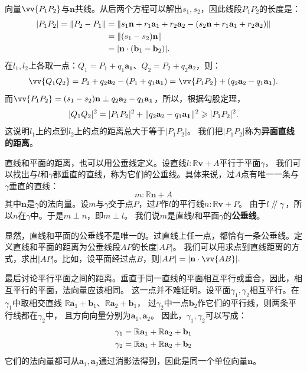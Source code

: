 \documentclass[12pt,UTF8]{ctexbook}
\renewcommand\parallel{\mathrel{/\mskip-4mu/}}
\begin{document}
向量$\vv{P_1P_2}$与$\mathbf{n}$共线。从后两个方程可以解出$s_1,s_2$，因此线段$P_1P_2$的长度是：
\begin{align}
    |P_1P_2| = \|P_2 - P_1\| &= \|s_1\mathbf{n} + r_1\mathbf{a}_1 + r_2\mathbf{a}_2 - (s_2\mathbf{n} + r_1\mathbf{a}_1 + r_2\mathbf{a}_2)\| \notag \\
    &= \| (s_1 - s_2)\mathbf{n} \| \notag \\
    &= |\mathbf{n}\cdot(\mathbf{b}_1 - \mathbf{b}_2)|. \notag
\end{align}
在$l_1,l_2$上各取一点：$Q_1 = P_1 + q_1\mathbf{a_1}$、$Q_2 = P_2 + q_2\mathbf{a}_2$，则：
\begin{align}
    \vv{Q_1Q_2} = P_2 + q_2\mathbf{a}_2 - (P_1 + q_1\mathbf{a_1}) = \vv{P_1P_2}  + (q_2\mathbf{a}_2 - q_1\mathbf{a_1}). \notag 
\end{align}
而$\vv{P_1P_2} = (s_1 - s_2)\mathbf{n} \perp q_2\mathbf{a}_2 - q_1\mathbf{a_1}$，所以，根据勾股定理，
\begin{align}
    |Q_1Q_2|^2 = |P_1P_2|^2 + \|q_2\mathbf{a}_2 - q_1\mathbf{a_1}\|^2 \geqslant |P_1P_2|^2. \notag 
\end{align}
这说明$l_1$上的点到$l_2$上的点的距离总大于等于$|P_1P_2|$。
我们把$|P_1P_2|$称为\textbf{异面直线的距离}。

直线和平面的距离，也可以用公垂线定义。设直线$l:\mathbb{R}\mathbf{v} + A$平行于平面$\gamma$，
我们可以找出与$l$和$\gamma$都垂直的直线，称为它们的公垂线。具体来说，过$A$点有唯一一条与$\gamma$垂直的直线：
$$ m:\mathbb{R}\mathbf{n} + A $$
其中$\mathbf{n}$是$\gamma$的法向量。设$m$与$\gamma$交于点$P$，过$P$作$l$的平行线$n:\mathbb{R}\mathbf{v} + P$。
由于$l\parallel\gamma$，所以$n$在$\gamma$中。于是$m\perp n$，即$m\perp l$。
我们说$m$是直线$l$和平面$\gamma$的\textbf{公垂线}。

显然，直线和平面的公垂线不是唯一的。过直线上任一点，都恰有一条公垂线。定义直线和平面的距离为公垂线段$AP$的长度$|AP|$。
我们可以用求点到直线距离的方式，求出$|AP|$。比如，设平面经过点$B$，则$|AP| = |\mathbf{n}\cdot \vv{AB}|.$

最后讨论平行平面之间的距离。垂直于同一直线的平面相互平行或重合，因此，相互平行的平面，法向量应该相同。
这一点并不难证明。设平面$\gamma_1,\gamma_2$相互平行。在$\gamma_1$中取相交直线
$\mathbb{R}\mathbf{a}_1 + \mathbf{b}_1$、$\mathbb{R}\mathbf{a}_2 + \mathbf{b}_1$，
过$\gamma_2$中一点$\mathbf{b}_2$作它们的平行线，则两条平行线都在$\gamma_2$中，
且方向向量分别为$\mathbf{a}_1,\mathbf{a}_2$。
因此，$\gamma_1,\gamma_2$可以写成：
\begin{align}
    \gamma_1 = \mathbb{R}\mathbf{a}_1 + \mathbb{R}\mathbf{a}_2 + \mathbf{b}_1 \notag \\
    \gamma_2 = \mathbb{R}\mathbf{a}_1 + \mathbb{R}\mathbf{a}_2 + \mathbf{b}_2 \notag
\end{align}
它们的法向量都可从$\mathbf{a}_1,\mathbf{a}_2$通过消影法得到，因此是同一个单位向量$\mathbf{n}$。
\end{document}
